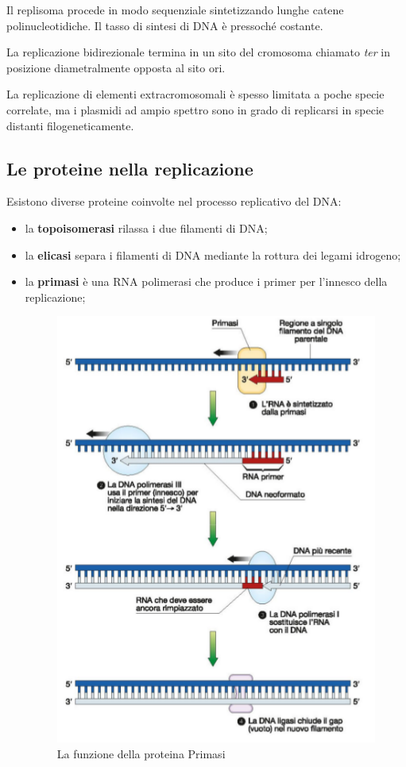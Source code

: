 \documentclass[11pt]{book}
\begin{document}
Il replisoma procede in modo sequenziale sintetizzando lunghe catene polinucleotidiche. Il tasso di sintesi di DNA è pressoché costante.

La replicazione bidirezionale termina in un sito del cromosoma chiamato \emph{ter} in posizione diametralmente opposta al sito ori.

La replicazione di elementi extracromosomali è spesso limitata a poche specie correlate, ma i plasmidi ad ampio spettro sono in grado di replicarsi in specie 
distanti filogeneticamente.

\clearpage
\subsection{Le proteine nella replicazione}
Esistono diverse proteine coinvolte nel processo replicativo del DNA:
\begin{itemize}
\item la \textbf{topoisomerasi} rilassa i due filamenti di DNA;
\item la \textbf{elicasi} separa i filamenti di DNA mediante la rottura dei legami idrogeno;
\item la \textbf{primasi} è una RNA polimerasi che produce i primer per l’innesco della replicazione;

\begin{figure}[htp]
\centering
\includegraphics[scale=0.6]{img/Funzione Primasi.png}
\caption{La funzione della proteina Primasi}
\label{}
\end{figure}



\end{itemize}
\end{document}
